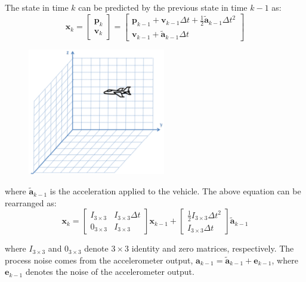 \documentclass{beamer}
\begin{document}
\begin{frame}
	The state in time $k$ can be predicted by the previous state in time $k-1$ as:
	$$
	\boldsymbol{x}_k=\left[\begin{array}{c}
		\boldsymbol{p}_k \\
		\boldsymbol{v}_k
	\end{array}\right]=\left[\begin{array}{r}
		\boldsymbol{p}_{k-1}+\boldsymbol{v}_{k-1} \Delta t+\frac{1}{2} \widetilde{\boldsymbol{a}}_{k-1} \Delta t^2 \\
		\boldsymbol{v}_{k-1}+\widetilde{\boldsymbol{a}}_{k-1} \Delta t
	\end{array}\right]
	$$
		\begin{figure}
				\centering
				\includegraphics[width=6cm]{case1-1.png}
			\end{figure}
\end{frame}

\begin{frame}
	where $\tilde{\boldsymbol{a}}_{k-1}$ is the acceleration applied to the vehicle. The above equation can be rearranged as:
$$
\boldsymbol{x}_k=\left[\begin{array}{cc}
	I_{3 \times 3} & I_{3 \times 3} \Delta t \\
	0_{3 \times 3} & I_{3 \times 3}
\end{array}\right] \boldsymbol{x}_{k-1}+\left[\begin{array}{c}
	\frac{1}{2} I_{3 \times 3} \Delta t^2 \\
	I_{3 \times 3} \Delta t
\end{array}\right] \widetilde{\boldsymbol{a}}_{k-1}
$$

where $I_{3 \times 3}$ and $0_{3 \times 3}$ denote $3 \times 3$ identity and zero matrices, respectively. The process noise comes from the accelerometer output, $\boldsymbol{a}_{k-1}=\widetilde{\boldsymbol{a}}_{k-1}+\boldsymbol{e}_{k-1}$, where $\boldsymbol{e}_{k-1}$ denotes the noise of the accelerometer output. 
\end{frame}
\end{document}
